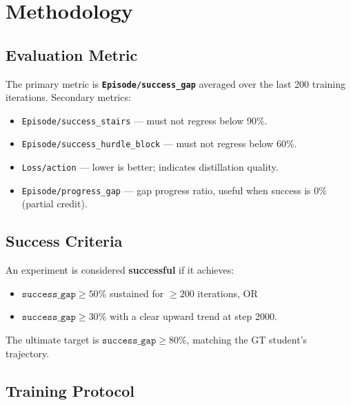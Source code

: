 \documentclass[11pt,a4paper]{article}
\begin{document}
\section{Methodology}

\subsection{Evaluation Metric}

The primary metric is \textbf{\texttt{Episode/success\_gap}} averaged over
the last 200 training iterations.  Secondary metrics:

\begin{itemize}[nosep]
  \item \texttt{Episode/success\_stairs} --- must not regress below 90\%.
  \item \texttt{Episode/success\_hurdle\_block} --- must not regress below 60\%.
  \item \texttt{Loss/action} --- lower is better; indicates distillation quality.
  \item \texttt{Episode/progress\_gap} --- gap progress ratio, useful when
        success is 0\% (partial credit).
\end{itemize}

\subsection{Success Criteria}

An experiment is considered \textbf{successful} if it achieves:
\begin{itemize}[nosep]
  \item $\texttt{success\_gap} \geq 50\%$ sustained for $\geq 200$ iterations, OR
  \item $\texttt{success\_gap} \geq 30\%$ with a clear upward trend at step 2000.
\end{itemize}

The ultimate target is $\texttt{success\_gap} \geq 80\%$, matching the GT
student's trajectory.

\subsection{Training Protocol}
\end{document}
